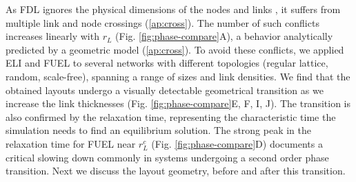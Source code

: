 \documentclass[endfloats,nofootinbib,preprint,floatfix,titlepage,superscriptaddress]{revtex4} %
\begin{document}
As FDL ignores the physical dimensions of the nodes and links%
, it suffers from multiple link and node crossings (\ref{ap:cross}). %
The number of such conflicts increases linearly with $r_L$ (Fig. \ref{fig:phase-compare}A), a behavior analytically predicted by a geometric model (\ref{ap:cross}). %
To avoid these conflicts, we applied ELI and FUEL to several networks with different topologies (regular lattice, random, scale-free), spanning a range of sizes and link densities. 
We find that the obtained layouts undergo a visually detectable geometrical transition as we increase the link thicknesses (Fig. \ref{fig:phase-compare}E, F, I, J). 
The transition is also confirmed by the relaxation time, representing the characteristic time the simulation needs to find an equilibrium solution. The strong peak in the relaxation time for FUEL near $r_L^c$ (Fig. \ref{fig:phase-compare}D)
documents a critical slowing down commonly in systems undergoing a second order phase transition. 
Next we discuss the layout geometry, before and after this transition.%
\end{document}

